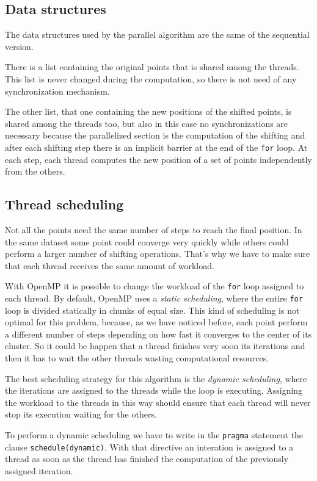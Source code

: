\documentclass[10pt,twocolumn,letterpaper]{article}
\begin{document}
\subsection{Data structures}

The data structures used by the parallel algorithm are the same of the sequential version.

There is a list containing the original points that is shared among the threads. This list is never changed during the computation, so there is not need of any synchronization mechanism. 

The other list, that one containing the new positions of the shifted points, is shared among the threads too, but also in this case no synchronizations are necessary because the parallelized section is the computation of the shifting and after each shifting step there is an implicit barrier at the end of the \verb"for" loop. At each step, each thread computes the new position of a set of points independently from the others.

\subsection{Thread scheduling}

Not all the points need the same number of steps to reach the final position. In the same dataset some point could converge very quickly while others could perform a larger number of shifting operations. That's why we have to make sure that each thread receives the same amount of workload.

With OpenMP it is possible to change the workload of the \verb"for" loop assigned to each thread. By default, OpenMP uses a \textit{static scheduling}, where the entire \verb"for" loop is divided statically in chunks of equal size. This kind of scheduling is not optimal for this problem, because, as we have noticed before, each point perform a different number of steps depending on how fast it converges to the center of its cluster. So it could be happen that a thread finishes very soon its iterations and then it has to wait the other threads wasting computational resources.

The best scheduling strategy for this algorithm is the \textit{dynamic scheduling}, where the iterations are assigned to the threads while the loop is executing. Assigning the workload to the threads in this way should ensure that each thread will never stop its execution waiting for the others. 

To perform a dynamic scheduling we have to write in the \verb"pragma" statement the clause \verb"schedule(dynamic)". With that directive an interation is assigned to a thread as soon as the thread has finished the computation of the previously assigned iteration.
\end{document}
